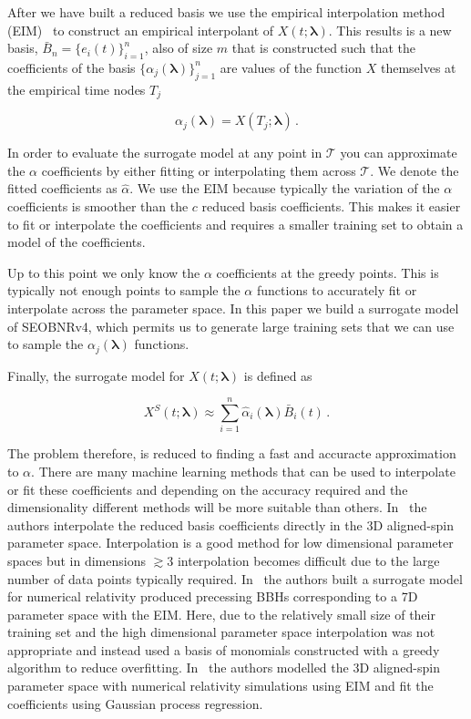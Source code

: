 \documentclass[aps,prd,reprint,superscriptaddress,preprintnumbers,showpacs,nofootinbib]{revtex4-1}
\begin{document}
After we have built a reduced basis we use the empirical interpolation method
(EIM)~\cite{BARRAULT2004667, 1534-0392_2009_1_383} to construct an empirical
interpolant of $X(t; \boldsymbol{\lambda})$. This results is a new basis,
$\bar{B}_n = \{e_i(t)\}_{i=1}^{n}$, also of size $m$ that is constructed such
that the coefficients of the basis
$\{\alpha_j(\boldsymbol{\lambda})\}_{j=1}^{n}$ are values of the function $X$
themselves at the empirical time nodes $T_j$

\begin{equation}
\alpha_j(\boldsymbol{\lambda}) = X(T_j; \boldsymbol{\lambda}) \, .
\end{equation}

In order to evaluate the surrogate model at any point in $\mathcal{T}$ you can
approximate the $\alpha$ coefficients by either fitting or interpolating them
across $\mathcal{T}$. We denote the fitted coefficients as $\hat\alpha$. We use
the EIM because typically the variation of the $\alpha$ coefficients is smoother
than the $c$ reduced basis coefficients. This makes it easier to fit or
interpolate the coefficients and requires a smaller training set to obtain a
model of the coefficients.

Up to this point we only know the $\alpha$ coefficients at the greedy points.
This is typically not enough points to sample the $\alpha$ functions to
accurately fit or interpolate across the parameter space. In this paper we build
a surrogate model of SEOBNRv4, which permits us to generate large training
sets that we can use to sample the $\alpha_j(\boldsymbol{\lambda})$ functions.

Finally, the surrogate model for $X(t; \boldsymbol{\lambda})$ is defined as

\begin{equation}
X^S(t; \boldsymbol{\lambda}) \approx \sum_{i=1}^{n} \hat{\alpha}_{i}(\boldsymbol{\lambda}) \bar{B}_{i}(t) \, .
\label{equ:surfunc}
\end{equation}

The problem therefore, is reduced to finding a fast and accuracte approximation
to $\alpha$. There are many machine learning methods that can be used to
interpolate or fit these coefficients and depending on the accuracy required and
the dimensionality different methods will be more suitable than others.
In~\cite{2014CQGra..31s5010P} the authors interpolate the reduced basis coefficients
directly in the 3D aligned-spin parameter space. Interpolation is a good method
for low dimensional parameter spaces but in dimensions $\gtrsim 3$ interpolation
becomes difficult due to the large number of data points typically required.
In~\cite{PhysRevD.95.104023,PhysRevD.99.064045} the authors built a surrogate
model for numerical relativity produced precessing BBHs corresponding to a 7D
parameter space with the EIM. Here, due to the relatively small size of their
training set and the high dimensional parameter space interpolation was not
appropriate and instead used a basis of monomials constructed with a greedy
algorithm to reduce overfitting. In~\cite{PhysRevD.99.064045} the authors
modelled the 3D aligned-spin parameter space with numerical relativity
simulations using EIM and fit the coefficients using Gaussian process
regression.
\end{document}

